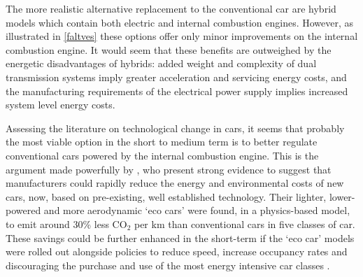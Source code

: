 The more realistic alternative replacement to the conventional car are hybrid
models which contain both electric and internal combustion engines. However,
as illustrated in \cref{faltves} these options offer only minor improvements
on the internal combustion engine. It would seem that these benefits are
outweighed by the energetic disadvantages of hybrids:
added weight and complexity of dual transmission systems imply greater
acceleration and servicing energy costs, and
the manufacturing requirements of  the electrical
power supply implies increased system level energy costs.

Assessing the literature on technological change in cars, it seems that
probably the most viable option in the short to medium term is to better
regulate conventional cars powered by the internal combustion engine.
This is the argument made powerfully by \citet{plowden2008cars}, who present
strong evidence to suggest that manufacturers could rapidly reduce the
energy and environmental costs of new cars, now, based on pre-existing,
well established technology. Their lighter, lower-powered and more
aerodynamic `eco cars' were found, in a physics-based model, to emit
around 30\% less CO$_2$ per km than conventional cars in five classes of
car. These savings could be further enhanced in the short-term if the `eco car'
models were rolled out alongside policies to reduce speed, increase occupancy
rates and discouraging the purchase and use of the most energy intensive
car classes \citep{plowden2008cars}.

